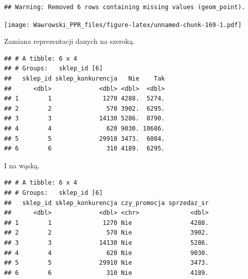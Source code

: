 \documentclass[]{book}
\newenvironment{Shaded}{\begin{snugshade}}{\end{snugshade}}
\newcommand{\KeywordTok}[1]{\textcolor[rgb]{0.13,0.29,0.53}{\textbf{#1}}}
\newcommand{\StringTok}[1]{\textcolor[rgb]{0.31,0.60,0.02}{#1}}
\newcommand{\OperatorTok}[1]{\textcolor[rgb]{0.81,0.36,0.00}{\textbf{#1}}}
\newcommand{\NormalTok}[1]{#1}
\begin{document}
\begin{verbatim}
## Warning: Removed 6 rows containing missing values (geom_point).
\end{verbatim}

\texttt{[image: Wawrowski\_PPR\_files/figure-latex/unnamed-chunk-169-1.pdf]}

Zamiana reprezentacji danych na szeroką.

\begin{Shaded}
\end{Shaded}

\begin{verbatim}
## # A tibble: 6 x 4
## # Groups:   sklep_id [6]
##   sklep_id sklep_konkurencja   Nie    Tak
##      <dbl>             <dbl> <dbl>  <dbl>
## 1        1              1270 4288.  5274.
## 2        2               570 3902.  6295.
## 3        3             14130 5286.  8790.
## 4        4               620 9030. 10686.
## 5        5             29910 3473.  6084.
## 6        6               310 4189.  6295.
\end{verbatim}

I na wąską.

\begin{Shaded}
\end{Shaded}

\begin{verbatim}
## # A tibble: 6 x 4
## # Groups:   sklep_id [6]
##   sklep_id sklep_konkurencja czy_promocja sprzedaz_sr
##      <dbl>             <dbl> <chr>              <dbl>
## 1        1              1270 Nie                4288.
## 2        2               570 Nie                3902.
## 3        3             14130 Nie                5286.
## 4        4               620 Nie                9030.
## 5        5             29910 Nie                3473.
## 6        6               310 Nie                4189.
\end{verbatim}
\end{document}
